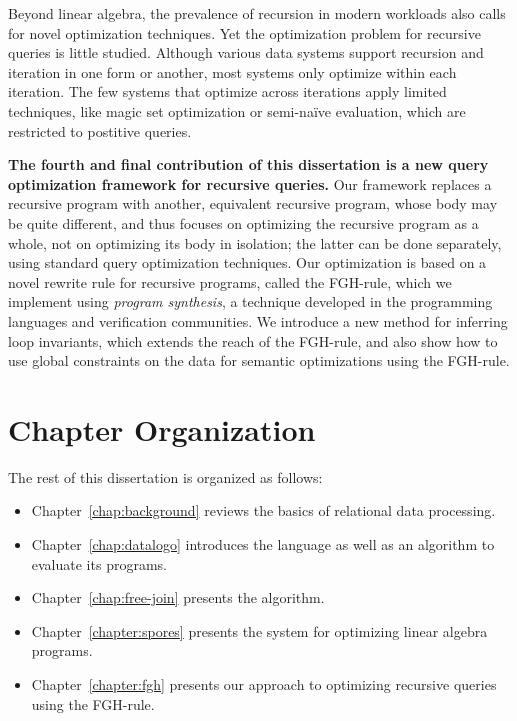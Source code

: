 Beyond linear algebra, 
 the prevalence of recursion in modern workloads
 also calls for novel optimization techniques.
Yet the optimization problem for recursive queries is little studied.
Although various data systems support recursion and iteration
 in one form or another, 
 most systems only optimize within each iteration.
The few systems that optimize across iterations
 apply limited techniques, like magic set optimization
 or semi-na\"ive evaluation,
 which are restricted to postitive queries.


\textbf{The fourth and final contribution of this dissertation is a new query optimization framework for
recursive queries.}
Our framework replaces a recursive program with
another, equivalent recursive program, whose body may be quite
different, and thus focuses on optimizing the recursive program as a
whole, not on optimizing its body in isolation; the latter can be done
separately, using standard query optimization techniques.  Our
optimization is based on a novel rewrite rule for recursive programs,
called the FGH-rule, which we implement using {\em program synthesis},
a technique developed in the programming languages and verification
communities. We introduce a new method for inferring loop invariants,
which extends the reach of the FGH-rule, and also show how to use
global constraints on the data for semantic optimizations using the
FGH-rule.  

\section{Chapter Organization}

The rest of this dissertation is organized as follows:
\begin{itemize}
  \item Chapter~\ref{chap:background} reviews the basics of relational data processing.
  \item Chapter~\ref{chap:datalogo} introduces the \datalogo language as well as an algorithm to evaluate its programs. 
  \item Chapter~\ref{chap:free-join} presents the \FJ algorithm.
  \item Chapter~\ref{chapter:spores} presents the \sys system for optimizing linear algebra programs.
  \item Chapter~\ref{chapter:fgh} presents our approach to optimizing recursive queries using the FGH-rule.
\end{itemize}